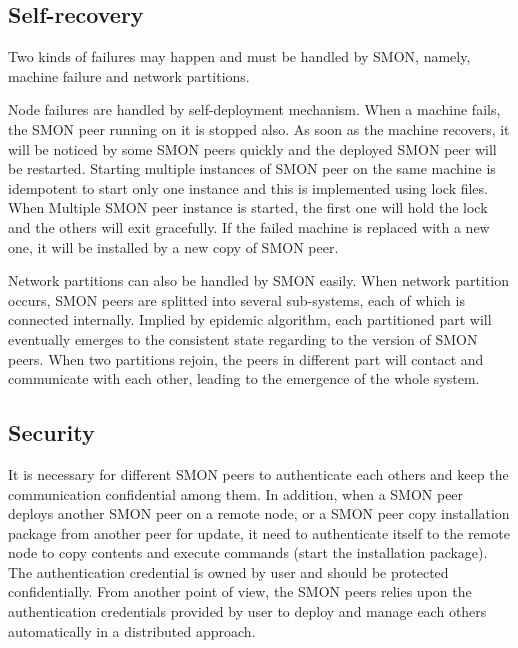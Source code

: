 
\subsection{Self-recovery}

Two kinds of failures may happen and must be handled by SMON,
namely, machine failure and network partitions.

Node failures are handled by self-deployment mechanism.
When a machine fails, the SMON peer running on it is stopped
also.  As soon as the machine recovers, it will be noticed
by some SMON peers quickly and the deployed SMON peer will
be restarted. Starting multiple instances of SMON peer on
the same machine is idempotent to start only one instance
and this is implemented using lock files. When Multiple SMON
peer instance is started, the first one will hold the lock
and the others will exit gracefully.  If the failed machine
is replaced with a new one, it will be installed by a new
copy of SMON peer.

Network partitions can also be handled by SMON easily. When
network partition occurs, SMON peers are splitted into
several sub-systems, each of which is connected internally.
Implied by epidemic algorithm, each partitioned part will
eventually emerges to the consistent state regarding to the
version of SMON peers. When two partitions rejoin, the peers
in different part will contact and communicate with each
other, leading to the emergence of the whole system.

\subsection{Security}
\label{subsec:security}

It is necessary for different SMON peers to authenticate
each others and keep the communication confidential among
them. In addition, when a SMON peer deploys another SMON
peer on a remote node, or a SMON peer copy installation
package from another peer for update, it need to
authenticate itself to the remote node to copy contents and
execute commands (start the installation package).  The
authentication credential is owned by user and should be
protected confidentially. From another point of view, the
SMON peers relies upon the authentication credentials
provided by user to deploy and manage each others
automatically in a distributed approach. 

